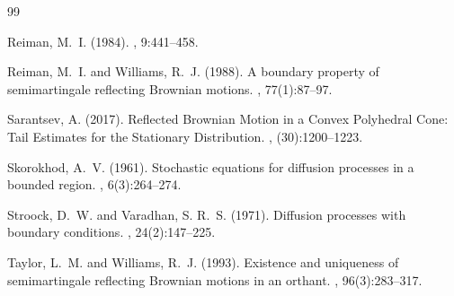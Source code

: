\documentclass[11pt]{article}
\theoremstyle{definition}
\begin{document}
\begin{thebibliography}{99}

{Reiman}, M.~I. (1984).
, 9:441--458.

Reiman, M.~I. and Williams, R.~J. (1988).
\newblock A boundary property of semimartingale reflecting {Brownian} motions.
, 77(1):87--97.


Sarantsev, A. (2017).
\newblock Reflected {Brownian} {Motion} in a {Convex} {Polyhedral} {Cone}:
  {Tail} {Estimates} for the {Stationary} {Distribution}.
, (30):1200–1223.

Skorokhod, A.~V. (1961).
\newblock Stochastic equations for diffusion processes in a bounded region.
, 6(3):264--274.


Stroock, D.~W. and Varadhan, S. R.~S. (1971).
\newblock Diffusion processes with boundary conditions.
,
  24(2):147–225.


Taylor, L.~M. and Williams, R.~J. (1993).
\newblock Existence and uniqueness of semimartingale reflecting {Brownian}
  motions in an orthant.
, 96(3):283--317.


\end{thebibliography}
\end{document}
